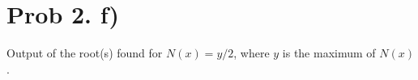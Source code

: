 \section{Prob 2. f)}




Output of the root(s) found for $N(x)=y/2$, where $y$ is the maximum of $N(x)$.


